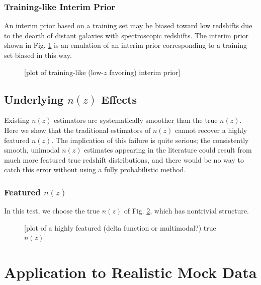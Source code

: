\documentclass[iop]{emulateapj}
\begin{document}
\subsubsection{Training-like Interim Prior}
\label{sec:trainintpr}

An interim prior based on a training set may be biased toward low redshifts due 
to the dearth of distant galaxies with spectroscopic redshifts.  The interim 
prior shown in Fig. \ref{fig:trainintpr} is an emulation of an interim prior 
corresponding to a training set biased in this way.

\begin{figure}
	\begin{center}
		\caption{[plot of training-like (low-$z$ favoring) interim 
prior]}
		\label{fig:trainintpr}
	\end{center}
\end{figure}

\subsection{Underlying $n(z)$ Effects}
\label{sec:truth}

Existing $n(z)$ estimators are systematically smoother than the true $n(z)$.  
Here we show that the traditional estimators of $n(z)$ cannot recover a highly 
featured $n(z)$.  The implication of this failure is quite serious; the 
consistently smooth, unimodal $n(z)$ estimates appearing in the literature 
could result from much more featured true redshift distributions, and there 
would be no way to catch this error without using a fully probabilistic method.

\subsubsection{Featured $n(z)$}
\label{sec:featured}

In this test, we choose the true $n(z)$ of Fig. \ref{fig:featured}, which has 
nontrivial structure.

\begin{figure}
	\begin{center}
		\caption{[plot of a highly featured (delta function or 
multimodal?) true $n(z)$]}
		\label{fig:featured}
	\end{center}
\end{figure}

\section{Application to Realistic Mock Data}
\label{sec:application}
\end{document}

